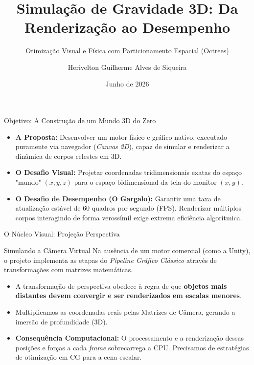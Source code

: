 \documentclass[10pt, aspectratio=169]{beamer}
\title[Simulação N-Corpos e Eficiência Gráfica]{Simulação de Gravidade 3D: Da Renderização ao Desempenho}
\subtitle{Otimização Visual e Física com Particionamento Espacial (Octrees)}
\author[Herivelton Siqueira]{Herivelton Guilherme Alves de Siqueira}
\institute[IMPA Tech]{
    Bacharelado em Matemática da Tecnologia e Inovação\\
    IMPA Tech
}
\date{Junho de 2026}
\begin{document}
\begin{frame}
    \titlepage
\end{frame}

\begin{frame}{Objetivo: A Construção de um Mundo 3D do Zero}
    \begin{itemize}
        \item \textbf{A Proposta:} Desenvolver um motor físico e gráfico nativo, executado puramente via navegador (\textit{Canvas 2D}), capaz de simular e renderizar a dinâmica de corpos celestes em 3D.
        \item \textbf{O Desafio Visual:} Projetar coordenadas tridimensionais exatas do espaço "mundo" $(x, y, z)$ para o espaço bidimensional da tela do monitor $(x, y)$.
        \item \textbf{O Desafio de Desempenho (O Gargalo):} Garantir uma taxa de atualização estável de 60 quadros por segundo (FPS). Renderizar múltiplos corpos interagindo de forma verossímil exige extrema eficiência algorítmica.
    \end{itemize}
\end{frame}

\begin{frame}{O Núcleo Visual: Projeção Perspectiva}
    \begin{block}{Simulando a Câmera Virtual}
        Na ausência de um motor comercial (como a Unity), o projeto implementa as etapas do \textit{Pipeline Gráfico Clássico} através de transformações com matrizes matemáticas.
    \end{block}
    
    \vspace{0.3cm}
    
    \begin{itemize}
        \item A transformação de perspectiva obedece à regra de que \textbf{objetos mais distantes devem convergir e ser renderizados em escalas menores}.
        \item Multiplicamos as coordenadas reais pelas Matrizes de Câmera, gerando a imersão de profundidade (3D).
        \item \textbf{Consequência Computacional:} O processamento e a renderização dessas posições e forças a cada \textit{frame} sobrecarrega a CPU. Precisamos de estratégias de otimização em CG para a cena escalar.
    \end{itemize}
\end{frame}
\end{document}
